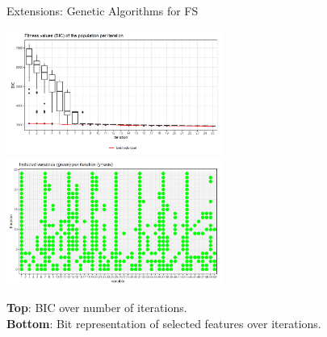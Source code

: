 \documentclass[11pt,compress,t,notes=noshow, xcolor=table]{beamer}
\begin{document}
\begin{vbframe}{Extensions: Genetic Algorithms for FS}
\vspace{-0.3cm}
        \begin{center}
        \includegraphics[width=0.53\textwidth]{figure/var-selection1.png}
        \includegraphics[width=0.53\textwidth]{figure/var-selection2.png}
     \end{center}
    \vspace{-0.5cm}
\textbf{Top}: BIC over number of iterations.\\
\textbf{Bottom}: Bit representation of selected features over iterations.
\end{vbframe}



\end{document}
